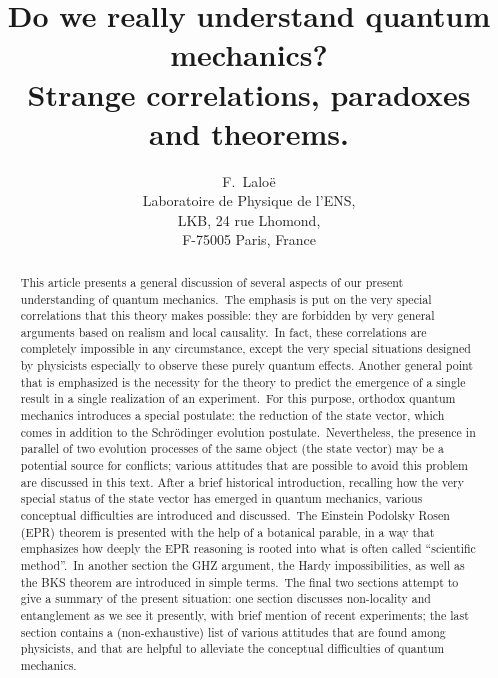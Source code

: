 \documentclass[12pt,onecolumn]{article}%
\begin{document}
\title{Do we really understand quantum mechanics?\\Strange correlations, paradoxes and theorems.}
\author{F.\ Lalo\"{e}\\Laboratoire de Physique de l'ENS,\\LKB, 24 rue Lhomond,\\F-75005 Paris, France}
\maketitle

\begin{abstract}
This article presents a general discussion of several aspects of our present
understanding of quantum mechanics.\ The emphasis is put on the very special
correlations that this theory makes possible: they are forbidden by very
general arguments based on realism and local causality.\ In fact, these
correlations are completely impossible in any circumstance, except the very
special situations designed by physicists especially to observe these purely
quantum effects. Another general point that is emphasized is the necessity for
the theory to predict the emergence of a single result in a single realization
of an experiment.\ For this purpose, orthodox quantum mechanics introduces a
special postulate: the reduction of the state vector, which comes in addition
to the Schr\"{o}dinger evolution postulate.\ Nevertheless, the presence in
parallel of two evolution processes of the same object (the state vector) may
be a potential source for conflicts; various attitudes that are possible to
avoid this problem are discussed in this text. After a brief historical
introduction, recalling how the very special status of the state vector has
emerged in quantum mechanics, various conceptual difficulties are introduced
and discussed.\ The Einstein Podolsky Rosen (EPR) theorem is presented with
the help of a botanical parable, in a way that emphasizes how deeply the EPR
reasoning is rooted into what is often called ``scientific method''.\ In
another section the GHZ argument, the Hardy impossibilities, as well as the
BKS theorem are introduced in simple terms.\ The final two sections attempt to
give a summary of the present situation: one section discusses non-locality
and entanglement as we see it presently, with brief mention of recent
experiments; the last section contains a (non-exhaustive) list of various
attitudes that are found among physicists, and that are helpful to alleviate
the conceptual difficulties of quantum mechanics.

\end{abstract}
\tableofcontents
\end{document}
